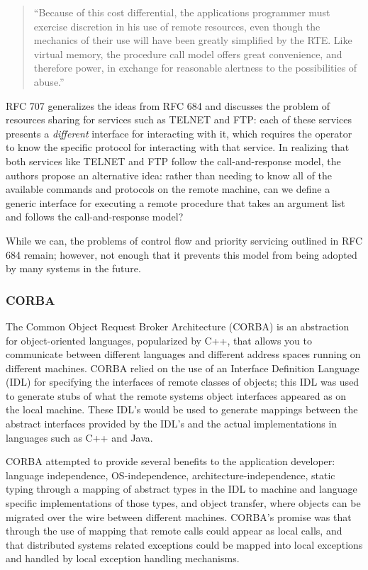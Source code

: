 \begin{quote}
``Because of this cost differential, the applications programmer must exercise discretion in his use of remote resources, even though the mechanics of their use will have been greatly simplified by the RTE. Like virtual memory, the procedure call model offers great convenience, and therefore power, in exchange for reasonable alertness to the possibilities of abuse.''
\end{quote}

RFC 707 generalizes the ideas from RFC 684 and discusses the problem of resources sharing for services such as TELNET and FTP: each of these services presents a \textit{different} interface for interacting with it, which requires the operator to know the specific protocol for interacting with that service.  In realizing that both services like TELNET and FTP follow the call-and-response model, the authors propose an alternative idea: rather than needing to know all of the available commands and protocols on the remote machine, can we define a generic interface for executing a remote procedure that takes an argument list and follows the call-and-response model?

While we can, the problems of control flow and priority servicing outlined in RFC 684 remain; however, not enough that it prevents this model from being adopted by many systems in the future.

\subsubsection{CORBA}

The Common Object Request Broker Architecture (CORBA) is an abstraction for object-oriented languages, popularized by C++, that allows you to communicate between different languages and different address spaces running on different machines.  CORBA relied on the use of an Interface Definition Language (IDL) for specifying the interfaces of remote classes of objects; this IDL was used to generate stubs of what the remote systems object interfaces appeared as on the local machine.  These IDL's would be used to generate mappings between the abstract interfaces provided by the IDL's and the actual implementations in languages such as C++ and Java.

CORBA attempted to provide several benefits to the application developer: language independence, OS-independence, architecture-independence, static typing through a mapping of abstract types in the IDL to machine and language specific implementations of those types, and object transfer, where objects can be migrated  over the wire between different machines.  CORBA's promise was that through the use of mapping that remote calls could appear as local calls, and that distributed systems related exceptions could be mapped into local exceptions and handled by local exception handling mechanisms.  

